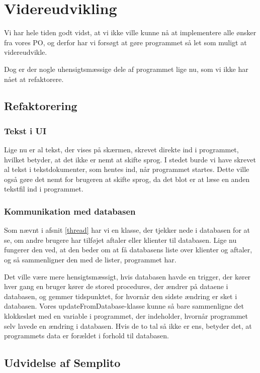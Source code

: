 \section{Videreudvikling}
\label{kapitel:Videreudvikling}

Vi har hele tiden godt vidst, at vi ikke ville kunne nå at implementere alle ønsker fra vores PO, og derfor har vi forsøgt at gøre programmet så let som muligt at videreudvikle.

Dog er der nogle uhensigtsmæssige dele af programmet lige nu, som vi ikke har nået at refaktorere.

\subsection{Refaktorering}
\subsubsection{Tekst i UI}
Lige nu er al tekst, der vises på skærmen, skrevet direkte ind i programmet, hvilket betyder, at det ikke er nemt at skifte sprog.
I stedet burde vi have skrevet al tekst i tekstdokumenter, som hentes ind, når programmet startes.
Dette ville også gøre det nemt for brugeren at skifte sprog, da det blot er at læse en anden tekstfil ind i programmet.

\subsubsection{Kommunikation med databasen}
Som nævnt i afsnit \ref{thread} har vi en klasse, der tjekker nede i databasen for at se, om andre brugere har tilføjet aftaler eller klienter til databasen.
Lige nu fungerer den ved, at den beder om at få databasens liste over klienter og aftaler, og så sammenligner den med de lister, programmet har.

Det ville være mere hensigtsmæssigt, hvis databasen havde en trigger, der kører hver gang en bruger kører de stored procedures, der ændrer på dataene i databasen, og gemmer tidspunktet, for hvornår den sidste ændring er sket i databasen.
Vores updateFromDatabase-klasse kunne så bare sammenligne det klokkeslæt med en variable i programmet, der indeholder, hvornår programmet selv lavede en ændring i databasen.
Hvis de to tal så ikke er ens, betyder det, at programmets data er forældet i forhold til databasen.

\subsection{Udvidelse af Semplito}

